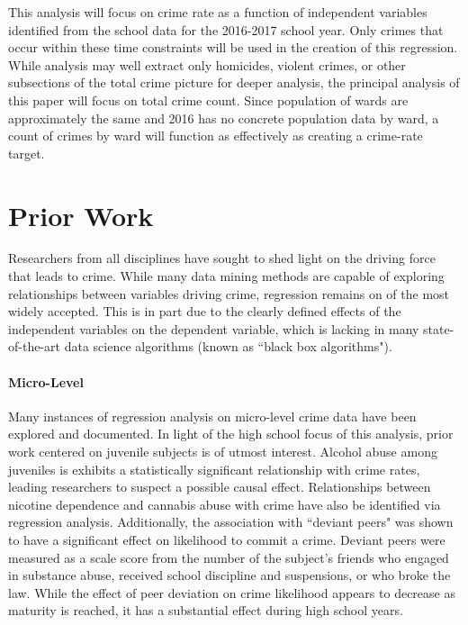 \documentclass[12pt]{article}
\begin{document}
\par

This analysis will focus on crime rate as a function of independent variables identified from the school data for the 2016-2017 school year.  Only crimes that occur within these time constraints will be used in the creation of this regression.  While analysis may well extract only homicides, violent crimes, or other subsections of the total crime picture for deeper analysis, the principal analysis of this paper will focus on total crime count.  Since population of wards are approximately the same and 2016 has no concrete population data by ward, a count of crimes by ward will function as effectively as creating a crime-rate target.

	\section{Prior Work}

Researchers from all disciplines have sought to shed light on the driving force that leads to crime.  While many data mining methods are capable of exploring relationships between variables driving crime, regression remains on of the most widely accepted.\cite{kaur}  This is in part due to the clearly defined effects of the independent variables on the dependent variable, which is lacking in many state-of-the-art data science algorithms (known as ``black box algorithms").

\paragraph{Micro-Level}

Many instances of regression analysis on micro-level crime data have been explored and documented.  In light of the high school focus of this analysis, prior work centered on juvenile subjects is of utmost interest.  Alcohol abuse among juveniles is exhibits a statistically significant relationship with crime rates, leading researchers to suspect a possible causal effect.\cite{fergusson}  Relationships between nicotine dependence and cannabis abuse with crime have also be identified via regression analysis.\cite{ferg2}  Additionally, the association with ``deviant peers" was shown to have a significant effect on likelihood to commit a crime.  Deviant peers were measured as a scale score from the number of the subject's friends who engaged in substance abuse, received school discipline and suspensions, or who broke the law.  While the effect of peer deviation on crime likelihood appears to decrease as maturity is reached, it has a substantial effect during high school years.\cite{ferg2}
\end{document}

